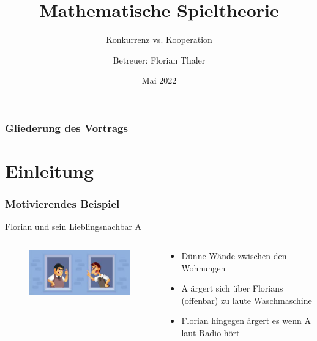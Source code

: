 \documentclass{beamer}
\title{Mathematische Spieltheorie}
\subtitle{Konkurrenz vs. Kooperation}
\author{Betreuer: Florian Thaler}
\date{Mai 2022}
\begin{document}
	\begin{frame}[plain]
		\titlepage
	\end{frame}

	\begin{frame}
		\frametitle{Gliederung des Vortrags}
		\tableofcontents
	\end{frame}

	\section{Einleitung}
		
		\begin{frame}
 			\frametitle{Motivierendes Beispiel}
            Florian und sein Lieblingsnachbar A
            \vspace{0.25cm}
 			\begin{columns}
				\begin{column}{0.25\textwidth}
					\begin{figure}[t]
						\includegraphics[scale = 0.35]{images/fightingNeighbours}	
					\end{figure}
				\end{column}
				\begin{column}{0.5\textwidth}
                    \vspace{0.5cm}
					\begin{itemize}
                        \item Dünne Wände zwischen den Wohnungen
                        \item A ärgert sich über Florians (offenbar) zu laute Waschmaschine
                        \item Florian hingegen ärgert es wenn A laut Radio hört
					\end{itemize}
				\end{column}
			\end{columns}
		\end{frame}
\end{document}
